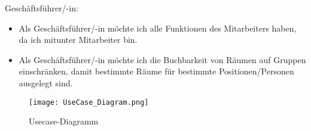 \noindent Geschäftsführer/-in:

\begin{itemize}
    \item Als Geschäftsführer/-in möchte ich alle Funktionen des Mitarbeiters haben, da ich mitunter Mitarbeiter bin.

    \item Als Geschäftsführer/-in möchte ich die Buchbarkeit von Räumen auf Gruppen einschränken, damit bestimmte Räume für bestimmte Positionen/Personen ausgelegt sind.
\end{itemize}
\begin{figure}
    \centering
    \texttt{[image: UseCase\_Diagram.png]}
    \caption{Usecase-Diagramm}
    \label{fig:Usecase-Diagramm}
\end{figure}